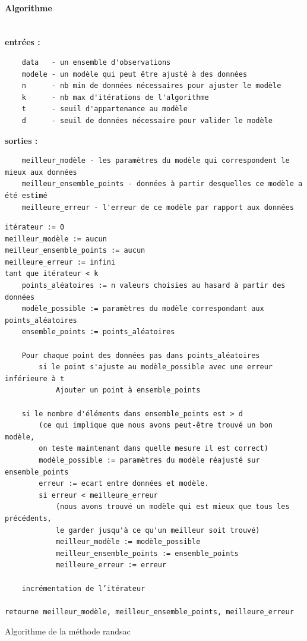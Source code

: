 \documentclass[main.tex]{subfiles}
\begin{document}
\paragraph{Algorithme}~\\
\textbf{entrées :}\vspace{-1em}
\begin{verbatim}
    data   - un ensemble d'observations
    modele - un modèle qui peut être ajusté à des données
    n      - nb min de données nécessaires pour ajuster le modèle
    k      - nb max d'itérations de l'algorithme
    t      - seuil d'appartenance au modèle
    d      - seuil de données nécessaire pour valider le modèle
\end{verbatim}
\textbf{sorties :}\vspace{-1em}
\begin{verbatim}
    meilleur_modèle - les paramètres du modèle qui correspondent le mieux aux données
    meilleur_ensemble_points - données à partir desquelles ce modèle a été estimé
    meilleure_erreur - l'erreur de ce modèle par rapport aux données
\end{verbatim}

\begin{listing}[H]
\begin{verbatim}
itérateur := 0
meilleur_modèle := aucun
meilleur_ensemble_points := aucun
meilleure_erreur := infini
tant que itérateur < k
    points_aléatoires := n valeurs choisies au hasard à partir des données
    modèle_possible := paramètres du modèle correspondant aux points_aléatoires
    ensemble_points := points_aléatoires

    Pour chaque point des données pas dans points_aléatoires
        si le point s'ajuste au modèle_possible avec une erreur inférieure à t
            Ajouter un point à ensemble_points

    si le nombre d'éléments dans ensemble_points est > d
        (ce qui implique que nous avons peut-être trouvé un bon modèle,
        on teste maintenant dans quelle mesure il est correct)
        modèle_possible := paramètres du modèle réajusté sur ensemble_points
        erreur := ecart entre données et modèle.
        si erreur < meilleure_erreur
            (nous avons trouvé un modèle qui est mieux que tous les précédents,
            le garder jusqu'à ce qu'un meilleur soit trouvé)
            meilleur_modèle := modèle_possible
            meilleur_ensemble_points := ensemble_points
            meilleure_erreur := erreur

    incrémentation de l’itérateur

retourne meilleur_modèle, meilleur_ensemble_points, meilleure_erreur
\end{verbatim}
\caption{Algorithme de la méthode randsac}
\end{listing}
\end{document}
